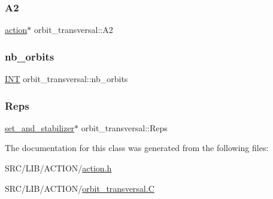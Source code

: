 \mbox{\label{classorbit__transversal_af3de70541aab8c07d8103ab92aff1208}} 
\subsubsection{\texorpdfstring{A2}{A2}}
{\footnotesize\ttfamily \mbox{\hyperlink{classaction}{action}}$\ast$ orbit\+\_\+transversal\+::\+A2}

\mbox{\label{classorbit__transversal_a7d9fe725543916f1b884874cf4decea6}} 
\subsubsection{\texorpdfstring{nb\+\_\+orbits}{nb\_orbits}}
{\footnotesize\ttfamily \mbox{\hyperlink{galois_8h_a09fddde158a3a20bd2dcadb609de11dc}{I\+NT}} orbit\+\_\+transversal\+::nb\+\_\+orbits}

\mbox{\label{classorbit__transversal_a04f80e6d4a5aa41c6d5ed4f5425a996e}} 
\subsubsection{\texorpdfstring{Reps}{Reps}}
{\footnotesize\ttfamily \mbox{\hyperlink{classset__and__stabilizer}{set\+\_\+and\+\_\+stabilizer}}$\ast$ orbit\+\_\+transversal\+::\+Reps}



The documentation for this class was generated from the following files\+:\begin{DoxyCompactItemize}
\item 
S\+R\+C/\+L\+I\+B/\+A\+C\+T\+I\+O\+N/\mbox{\hyperlink{action_8h}{action.\+h}}\item 
S\+R\+C/\+L\+I\+B/\+A\+C\+T\+I\+O\+N/\mbox{\hyperlink{orbit__transversal_8_c}{orbit\+\_\+transversal.\+C}}\end{DoxyCompactItemize}

